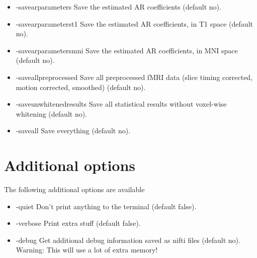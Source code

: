 \begin{itemize}
\item -savearparameters          
\newline \newline Save the estimated AR coefficients (default no). 

\item -savearparameterst1        
\newline \newline Save the estimated AR coefficients, in T1 space (default no). 

\item -savearparametersmni       
\newline \newline Save the estimated AR coefficients, in MNI space (default no). 

\item -saveallpreprocessed       
\newline \newline Save all preprocessed fMRI data  \newline (slice timing corrected, motion corrected, smoothed) (default no). 

\item -saveunwhitenedresults     
\newline \newline Save all statistical results without voxel-wise whitening (default no). 

\item -saveall                   
\newline \newline Save everything (default no). 


\end{itemize}

\section{Additional options}

The following additional options are available

\begin{itemize}

\item -quiet
\newline \newline Don't print anything to the terminal (default false). 

\item -verbose
\newline \newline Print extra stuff (default false).

\item -debug
\newline \newline Get additional debug information saved as nifti files (default no). Warning: This will use a lot of extra memory! 

\end{itemize}

